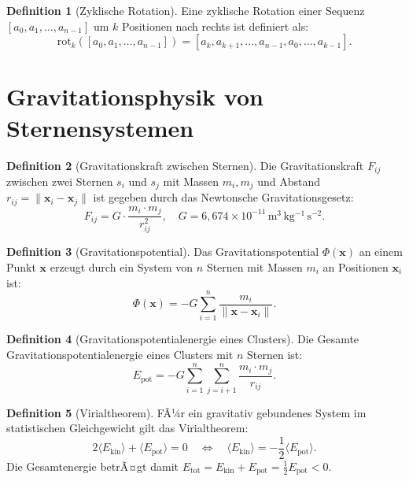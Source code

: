 ﻿\documentclass[a4paper,12pt]{report}
\theoremstyle{definition}
\newtheorem{definition}{Definition}
\begin{document}
\begin{definition}[Zyklische Rotation]
Eine zyklische Rotation einer Sequenz $[a_0, a_1, \ldots, a_{n-1}]$ um $k$ Positionen nach rechts ist definiert als:
\[
\mathrm{rot}_k([a_0, a_1, \ldots, a_{n-1}]) = [a_k, a_{k+1}, \ldots, a_{n-1}, a_0, \ldots, a_{k-1}].
\]
\end{definition}

\section{Gravitationsphysik von Sternensystemen}

\begin{definition}[Gravitationskraft zwischen Sternen]
Die Gravitationskraft $F_{ij}$ zwischen zwei Sternen $s_i$ und $s_j$ mit Massen $m_i, m_j$ und Abstand $r_{ij} = \|\mathbf{x}_i - \mathbf{x}_j\|$ ist gegeben durch das Newtonsche Gravitationsgesetz:
\[
F_{ij} = G \cdot \frac{m_i \cdot m_j}{r_{ij}^2}, \quad G = 6{,}674 \times 10^{-11} \, \mathrm{m^3 \, kg^{-1} \, s^{-2}}.
\]
\end{definition}

\begin{definition}[Gravitationspotential]
Das Gravitationspotential $\Phi(\mathbf{x})$ an einem Punkt $\mathbf{x}$ erzeugt durch ein System von $n$ Sternen mit Massen $m_i$ an Positionen $\mathbf{x}_i$ ist:
\[
\Phi(\mathbf{x}) = -G \sum_{i=1}^{n} \frac{m_i}{\|\mathbf{x} - \mathbf{x}_i\|}.
\]
\end{definition}

\begin{definition}[Gravitationspotentialenergie eines Clusters]
Die Gesamte Gravitationspotentialenergie eines Clusters mit $n$ Sternen ist:
\[
E_\mathrm{pot} = -G \sum_{i=1}^{n} \sum_{j=i+1}^{n} \frac{m_i \cdot m_j}{r_{ij}}.
\]
\end{definition}

\begin{definition}[Virialtheorem]
FÃ¼r ein gravitativ gebundenes System im statistischen Gleichgewicht gilt das Virialtheorem:
\[
2 \langle E_\mathrm{kin} \rangle + \langle E_\mathrm{pot} \rangle = 0 \quad \Longleftrightarrow \quad \langle E_\mathrm{kin} \rangle = -\frac{1}{2} \langle E_\mathrm{pot} \rangle.
\]
Die Gesamtenergie betrÃ¤gt damit $E_\mathrm{tot} = E_\mathrm{kin} + E_\mathrm{pot} = \frac{1}{2} E_\mathrm{pot} < 0$.
\end{definition}

\end{document}
